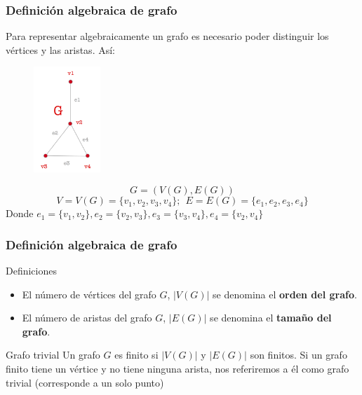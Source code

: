 \documentclass{beamer}
\begin{document}
\begin{frame}
\frametitle{Definici\'on algebraica de grafo}
Para representar algebraicamente un grafo es necesario poder distinguir los v\'ertices y las aristas. As\'i:

\begin{figure}[h]
 \label{fig:volumen}
\centering
\includegraphics[height=4cm]{g3}
\end{figure}
\[G=(V(G),E(G))\]
\[V = V(G) = \{v_1,v_2,v_3,v_4\};\ \ E = E(G) = \{e_1,e_2,e_3,e_4\}\]
Donde $e_1 = \{v_1,v_2\}, e_2 = \{v_2,v_3\}, e_3 = \{v_3,v_4\}, e_4 = \{v_2,v_4\}$
\end{frame}









\begin{frame}
\frametitle{Definici\'on algebraica de grafo}

\begin{block}{Definiciones}
\begin{itemize}
\item El n\'umero de v\'ertices del grafo $G$, $|V(G)|$ se denomina el \textbf{orden del grafo}. 
\item El n\'umero de aristas del grafo $G$, $|E(G)|$ se denomina el \textbf{tama\~no del grafo}.
\end{itemize}
\end{block}

\begin{block}{Grafo trivial}
 Un grafo $G$ es finito si $|V(G)|$ y $|E(G)|$ son finitos. Si un grafo finito tiene un v\'ertice y no tiene ninguna arista, nos referiremos a \'el como grafo trivial (corresponde a un solo punto)
\end{block}
\end{frame}
\end{document}

